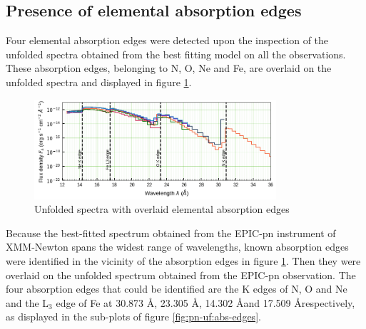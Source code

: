    \subsection{Presence of elemental absorption edges}
    Four elemental absorption edges were detected upon the inspection of the unfolded spectra obtained from the best fitting model on all the observations. These absorption edges, belonging to N, O, Ne and Fe, are overlaid on the unfolded spectra and displayed in figure \ref{fig:all-uf:abs-edges}.
    \begin{figure}[!htb]
        \centering
        \includegraphics[width=0.8\textwidth]{figures/eufspec/mr-vel-uf-ang_abs-edge.png}
        \caption{Unfolded spectra with overlaid elemental absorption edges}
        \label{fig:all-uf:abs-edges}
    \end{figure}

    Because the best-fitted spectrum obtained from the EPIC-pn instrument of XMM-Newton spans the widest range of wavelengths, known absorption edges \cite{bearden1967reevaluation,juett2006high} were identified in the vicinity of the absorption edges in figure \ref{fig:all-uf:abs-edges}. Then they were overlaid on the unfolded spectrum obtained from the EPIC-pn observation. The four absorption edges that could be identified are the K edges of N, O and Ne and the L$_3$ edge of Fe at 30.873 \AA, 23.305 \AA, 14.302 \AA and 17.509 \AA respectively, as displayed in the sub-plots of figure \ref{fig:pn-uf:abs-edges}.

